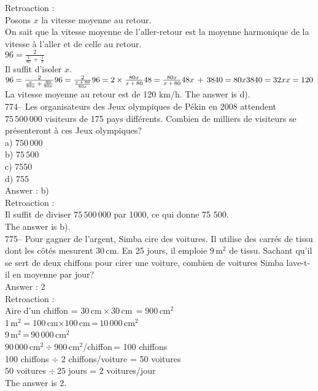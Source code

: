 ﻿\documentclass[letterpaper, 12pt]{article}
\begin{document}
Retroaction : \\
Posons $x$ la vitesse moyenne au retour.\\
On sait que la vitesse moyenne de l'aller-retour est la moyenne harmonique
de la vitesse \`a l'aller et de celle au retour.  \\[2mm]
$96=\frac{2}{\frac{1}{80}\,+\,\frac{1}{x}}$\\[2mm]
Il suffit d'isoler $x$.\\[2mm]
$96=\frac{2}{\frac{x}{80x}\,+\,\frac{80}{80x}}\\[2mm]
96=\frac{2}{\frac{x\,+\,80}{80x}}\\[2mm]
96=2\times\frac{80x}{x\,+\,80}\\[2mm]
48=\frac{80x}{x\,+\,80}\\[2mm]
48x\,+\,3840=80x\\[2mm]
3840=32x\\[2mm]
x=120$\\[2mm]
La vitesse moyenne au retour est de 120 km/h.  The answer is d).\\

774-- Les organisateurs des Jeux olympiques de P\'ekin en 2008 attendent
$75\,500\,000$ visiteurs de 175 pays diff\'erents.  Combien de milliers de
visiteurs se pr\'esenteront \`a ces Jeux olympiques?\\
a) $750\,000$\\
b) $75\,500$\\
c) 7550\\
d) 755\\

Answer : b)\\

Retroaction : \\
Il suffit de diviser  $75\,500\,000$ par 1000, ce qui donne 75 500.\\
The answer is b).\\

775-- Pour gagner de l'argent, Simba cire des voitures.  Il utilise des
carr\'es de tissu dont les c\^ot\'es mesurent 30\,cm.  En 25 jours, il
emploie 9\,m$^{2}$ de tissu.  Sachant qu'il se sert de deux chiffons pour
cirer une voiture, combien de voitures Simba lave-t-il en moyenne par
jour?\\

Answer : 2\\

Retroaction : \\
Aire d'un chiffon = $30$\,cm\,$\times\,30$\,cm$\,=900$\,cm$^{2}$\\
1\,m$^{2}=100$\,cm$\times100$\,cm\,=\,$10\,000$\,cm$^{2}$\\
9\,m$^{2}$\,=\,$90\,000$\,cm$^{2}$\\
$90\,000$\,cm$^{2}\div900$\,cm$^{2}$/chiffon\,= 100 chiffons\\
100 chiffons $\div$ 2 chiffons/voiture  = 50 voitures\\
50 voitures $\div \,25 $ jours = 2 voitures/jour\\
The answer is 2.\\
\end{document}
